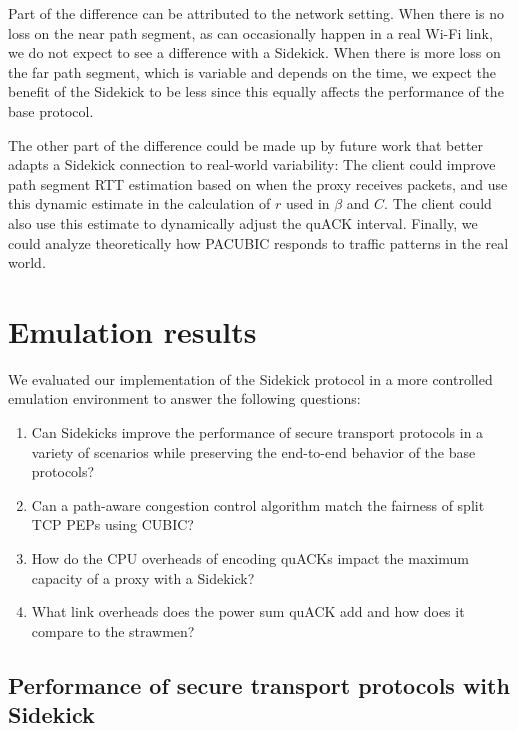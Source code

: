 Part of the difference can be attributed to the network setting. When there is
no loss on the near path segment, as can occasionally happen in a real Wi-Fi link,
we do not expect to
see a difference with a Sidekick. When there is more loss on the far path segment, which
is variable and depends on the time, we
expect the benefit of the Sidekick to be less since this equally affects the
performance of the base protocol.

The other part of the difference could be made up by future work that better
adapts a Sidekick connection to real-world variability: The client could improve
path segment RTT estimation based on when the proxy receives packets, and use this
dynamic estimate in the calculation of $r$ used in $\beta$ and $C$.
The client could also use
this estimate to dynamically adjust the quACK interval.
Finally, we could analyze theoretically how PACUBIC responds
to traffic patterns in the real world.

\section{Emulation results}
\label{sec:sidekick:emulation}



We evaluated our implementation of the Sidekick protocol in a more controlled
emulation environment to answer the following questions:
\begin{enumerate}[noitemsep,topsep=0pt]
	\item Can Sidekicks improve the performance of secure transport protocols
	in a variety of scenarios while preserving the end-to-end behavior of the
	base protocols?
	\item Can a path-aware congestion control algorithm match the fairness of
	split TCP PEPs using CUBIC?
	\item How do the CPU overheads of encoding quACKs impact the maximum
	capacity of a proxy with a Sidekick?
	\item What link overheads does the power sum quACK add and how does it
	compare to the strawmen?
\end{enumerate}

\subsection{Performance of secure transport protocols with Sidekick}
\label{sec:sidekick:emulation:performance}

